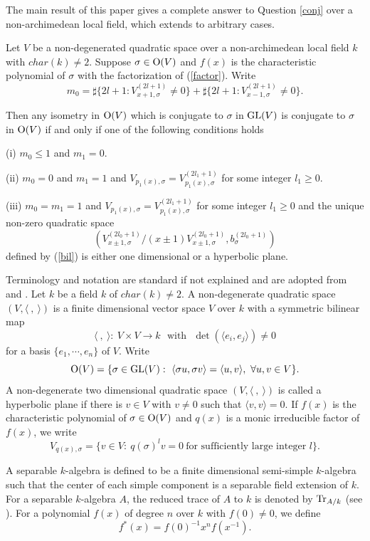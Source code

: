 \documentclass[12pt]{amsart}
\begin{document}
The main result of this paper gives a complete answer to Question \ref{conj}  over a non-archimedean local field, which extends \cite[Theorem 2.1]{Mil} to arbitrary cases.

\begin{thm} \label{main} Let $V$ be a non-degenerated quadratic space over a non-archimedean local field $k$ with $char(k)\neq 2$. Suppose $\sigma\in {\rm O}(V)$ and $f(x)$ is the characteristic polynomial of $\sigma$ with the factorization of (\ref{factor}). Write 
$$ m_0= \sharp \{ 2l+1 : V_{x+1, \sigma}^{(2l+1)} \neq 0  \} + \sharp \{ 2l+1: V_{x-1, \sigma}^{(2l+1)} \neq 0 \} . $$

Then any isometry in ${\rm O}(V)$ which is conjugate to $\sigma$ in ${\rm GL}(V)$ is conjugate to $\sigma$ in ${\rm O}(V)$ if and only if  one of the following conditions holds

(i) $m_0\leq 1$ and $m_1=0$.

(ii) $m_0=0$ and $m_1=1$ and $V_{p_1(x), \sigma}=V_{p_1(x), \sigma}^{(2l_1+1)}$ for some integer $l_1\geq 0$.   

(iii) $m_0=m_1=1$ and $V_{p_1(x), \sigma}=V_{p_1(x), \sigma}^{(2l_1+1)}$ for some integer $l_1\geq 0$ and the unique non-zero quadratic space $$(V_{x\pm 1, \sigma}^{(2l_0+1)}/(x\pm 1)V_{x\pm 1, \sigma}^{(2l_0+1)} , b_\sigma^{(2l_0+1)})$$ defined by (\ref{bil}) is either one dimensional or a hyperbolic plane.
\end{thm}


Terminology and notation are standard if not explained and are adopted from \cite{OM} and \cite{Mil}. Let $k$ be a field $k$ of $char(k)\neq 2$.  A non-degenerate quadratic space $(V,  \langle \ , \  \rangle )$ is a finite dimensional vector space $V$ over $k$ with a symmetric bilinear map $$  \langle \ , \  \rangle : \  V\times V \longrightarrow k \ \ \ \text{with} \ \ \ \det(\langle e_i, e_j \rangle) \neq 0 $$ for a basis $\{ e_1, \cdots, e_n \}$ of $V$.  Write $$ {\rm O}(V)=\{ \sigma \in {\rm GL}(V): \  \langle \sigma u, \sigma v \rangle  =  \langle u, v \rangle ,  \ \forall u, v \in V \} . $$
A non-degenerate two dimensional quadratic space $(V, \langle \  , \  \rangle)$ is called a hyperbolic plane if there is $v\in V$ with $v\neq 0$ such that $\langle  v , v \rangle =0$. 
If $f(x)$ is the characteristic polynomial of $\sigma\in {\rm O}(V)$ and $q(x)$ is a monic irreducible factor of $f(x)$, we write 
$$ V_{q(x), \sigma} =\{ v\in V: \ q(\sigma)^l v =0   \ \text{for sufficiently large integer $l$} \} . $$ 

A separable $k$-algebra is defined to be a finite dimensional semi-simple $k$-algebra such that the center of each simple component is a separable field extension of $k$. For a separable $k$-algebra $A$, the reduced trace of $A$ to $k$ is denoted by ${\rm Tr}_{A/k}$ (see \cite[\S 9]{Reiner}).  For a polynomial $f(x)$ of degree $n$ over $k$ with $f(0)\neq 0$, we define $$f^*(x)= f(0)^{-1} x^n f(x^{-1}) . $$
\end{document}
